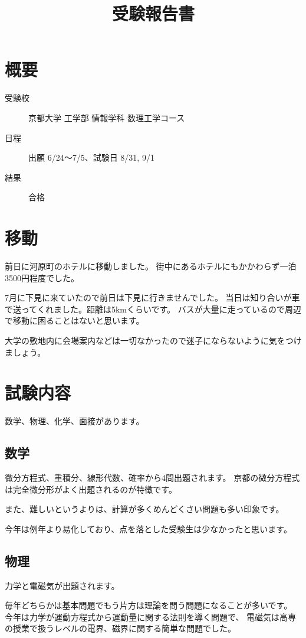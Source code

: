 \documentclass[]{jsarticle}
\title{受験報告書}
\date{}
\begin{document}
\maketitle
\section*{概要}
    \begin{description}
        \item[受験校] 京都大学 工学部 情報学科 数理工学コース
        \item[日程] 出願 6/24〜7/5、試験日 8/31, 9/1
        \item[結果] 合格
    \end{description}
\section*{移動}
    前日に河原町のホテルに移動しました。
    街中にあるホテルにもかかわらず一泊3500円程度でした。

    7月に下見に来ていたので前日は下見に行きませんでした。
    当日は知り合いが車で送ってくれました。距離は5kmくらいです。
    バスが大量に走っているので周辺で移動に困ることはないと思います。

    大学の敷地内に会場案内などは一切なかったので迷子にならないように気をつけましょう。
\section*{試験内容}
    数学、物理、化学、面接があります。
    \subsection*{数学}
        微分方程式、重積分、線形代数、確率から4問出題されます。
        京都の微分方程式は完全微分形がよく出題されるのが特徴です。

        また、難しいというよりは、計算が多くめんどくさい問題も多い印象です。
        
        今年は例年より易化しており、点を落とした受験生は少なかったと思います。
    \subsection*{物理}
        力学と電磁気が出題されます。

        毎年どちらかは基本問題でもう片方は理論を問う問題になることが多いです。
        今年は力学が運動方程式から運動量に関する法則を導く問題で、
        電磁気は高専の授業で扱うレベルの電界、磁界に関する簡単な問題でした。
\end{document}
